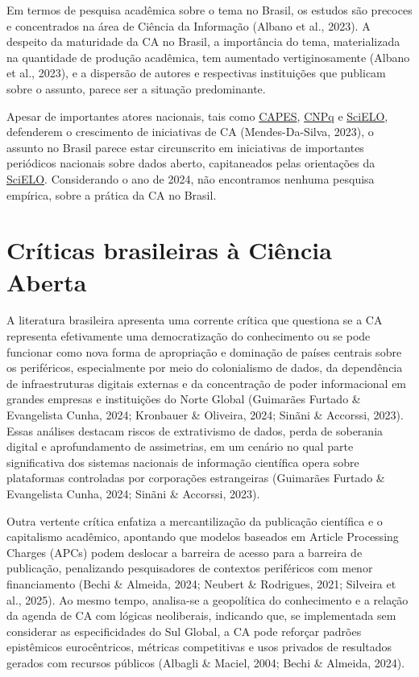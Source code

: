 \documentclass[
  a4paper,
]{book}
\begin{document}
Em termos de pesquisa acadêmica sobre o tema no Brasil, os estudos são
precoces e concentrados na área de Ciência da Informação (Albano et al.,
2023). A despeito da maturidade da CA no Brasil, a importância do tema,
materializada na quantidade de produção acadêmica, tem aumentado
vertiginosamente (Albano et al., 2023), e a dispersão de autores e
respectivas instituições que publicam sobre o assunto, parece ser a
situação predominante.

Apesar de importantes atores nacionais, tais como
\href{https://www.gov.br/capes/}{CAPES},
\href{https://www.gov.br/cnpq/}{CNPq} e
\href{https://scielo.org/}{SciELO}, defenderem o crescimento de
iniciativas de CA (Mendes-Da-Silva, 2023), o assunto no Brasil parece
estar circunscrito em iniciativas de importantes periódicos nacionais
sobre dados aberto, capitaneados pelas orientações da
\href{https://scielo.org/}{SciELO}. Considerando o ano de 2024, não
encontramos nenhuma pesquisa empírica, sobre a prática da CA no Brasil.

\section{Críticas brasileiras à Ciência
Aberta}\label{cruxedticas-brasileiras-uxe0-ciuxeancia-aberta}

A literatura brasileira apresenta uma corrente crítica que questiona se
a CA representa efetivamente uma democratização do conhecimento ou se
pode funcionar como nova forma de apropriação e dominação de países
centrais sobre os periféricos, especialmente por meio do colonialismo de
dados, da dependência de infraestruturas digitais externas e da
concentração de poder informacional em grandes empresas e instituições
do Norte Global (Guimarães Furtado \& Evangelista Cunha, 2024; Kronbauer
\& Oliveira, 2024; Sinãni \& Accorssi, 2023). Essas análises destacam
riscos de extrativismo de dados, perda de soberania digital e
aprofundamento de assimetrias, em um cenário no qual parte significativa
dos sistemas nacionais de informação científica opera sobre plataformas
controladas por corporações estrangeiras (Guimarães Furtado \&
Evangelista Cunha, 2024; Sinãni \& Accorssi, 2023).

Outra vertente crítica enfatiza a mercantilização da publicação
científica e o capitalismo acadêmico, apontando que modelos baseados em
Article Processing Charges (APCs) podem deslocar a barreira de acesso
para a barreira de publicação, penalizando pesquisadores de contextos
periféricos com menor financiamento (Bechi \& Almeida, 2024; Neubert \&
Rodrigues, 2021; Silveira et al., 2025). Ao mesmo tempo, analisa-se a
geopolítica do conhecimento e a relação da agenda de CA com lógicas
neoliberais, indicando que, se implementada sem considerar as
especificidades do Sul Global, a CA pode reforçar padrões epistêmicos
eurocêntricos, métricas competitivas e usos privados de resultados
gerados com recursos públicos (Albagli \& Maciel, 2004; Bechi \&
Almeida, 2024).
\end{document}
